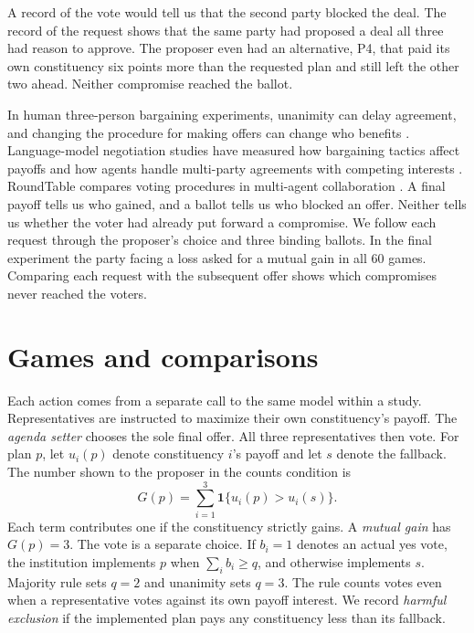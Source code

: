 \documentclass[11pt]{article}
\begin{document}
A record of the vote would tell us that the second party blocked the deal. The record of the request shows that the same party had proposed a deal all three had reason to approve. The proposer even had an alternative, P4, that paid its own constituency six points more than the requested plan and still left the other two ahead. Neither compromise reached the ballot.

In human three-person bargaining experiments, unanimity can delay agreement, and changing the procedure for making offers can change who benefits \cite{tremewan}. Language-model negotiation studies have measured how bargaining tactics affect payoffs \cite{bianchi} and how agents handle multi-party agreements with competing interests \cite{abdelnabi}. RoundTable compares voting procedures in multi-agent collaboration \cite{cho}. A final payoff tells us who gained, and a ballot tells us who blocked an offer. Neither tells us whether the voter had already put forward a compromise. We follow each request through the proposer's choice and three binding ballots. In the final experiment the party facing a loss asked for a mutual gain in all 60 games. Comparing each request with the subsequent offer shows which compromises never reached the voters.

\section{Games and comparisons}

Each action comes from a separate call to the same model within a study. Representatives are instructed to maximize their own constituency's payoff. The \emph{agenda setter} chooses the sole final offer. All three representatives then vote. For plan \(p\), let \(u_i(p)\) denote constituency \(i\)'s payoff and let \(s\) denote the fallback. The number shown to the proposer in the counts condition is
\begin{equation}
G(p)=\sum_{i=1}^{3}\mathbf{1}\{u_i(p)>u_i(s)\}.
\label{eq:gainers}
\end{equation}
Each term contributes one if the constituency strictly gains. A \emph{mutual gain} has \(G(p)=3\). The vote is a separate choice. If \(b_i=1\) denotes an actual yes vote, the institution implements \(p\) when \(\sum_i b_i\geq q\), and otherwise implements \(s\). Majority rule sets \(q=2\) and unanimity sets \(q=3\). The rule counts votes even when a representative votes against its own payoff interest. We record \emph{harmful exclusion} if the implemented plan pays any constituency less than its fallback.
\end{document}
